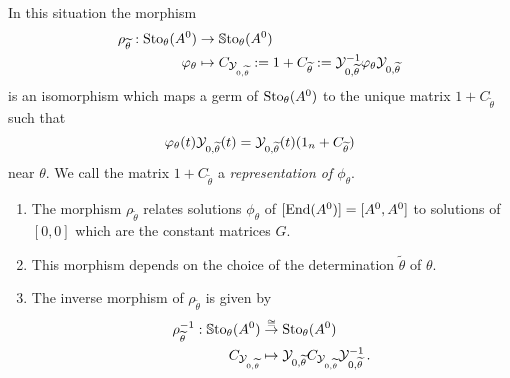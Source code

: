 \begin{prop}\label{prop:representation}
  In this situation the morphism
  \begin{align*}
    \rho_{\widetilde\theta}:\operatorname{Sto}_\theta(A^0)&\to\operatorname{\mathbb{S}to}_\theta(A^0)
    \\\varphi_\theta
    &\mapsto
    C_{\mathcal{Y}_{0,\widetilde\theta}}
    :=1+C_{\widetilde\theta}
    :=\mathcal{Y}_{0,\widetilde\theta}^{-1}\varphi_\theta\mathcal{Y}_{0,\widetilde\theta}
  \end{align*}
  is an isomorphism which maps a germ of $\operatorname{Sto}_\theta(A^0)$ to the unique
  matrix $1+C_{\tilde\theta}$ such that
  \begin{equation} \label{eq:representation}
    \varphi_\theta(t)\mathcal{Y}_{0,\widetilde\theta}(t)
    =\mathcal{Y}_{0,\widetilde\theta}(t)(1_n+C_{\widetilde\theta})
  \end{equation}
  near $\theta$.  We call the matrix $1+C_{\tilde\theta}$ a
  \emph{representation of $\phi_\theta$}.
  \begin{s-rem}
    \begin{enumerate}
      \item {}
        The morphism $\rho_{\tilde\theta}$ relates solutions $\phi_\theta$ of
        $[\operatorname{End}(A^0)]=[A^0,A^0]$ to solutions of $[0,0]$ which are the constant
        matrices $G$.
      \item This morphism depends on the choice of the determination
        $\tilde\theta$ of $\theta$.
      \item The inverse morphism of $\rho_{\tilde\theta}$ is given by
        \begin{align*}
          \rho_{\widetilde\theta}^{-1}:
          \operatorname{\mathbb{S}to}_\theta(A^0)
          &\overset{\cong}\to
          \operatorname{Sto}_\theta(A^0)
          \\C_{\mathcal{Y}_{0,\widetilde\theta}} &\mapsto
          \mathcal{Y}_{0,\widetilde\theta}C_{\mathcal{Y}_{0,\widetilde\theta}}\mathcal{Y}_{0,\widetilde\theta}^{-1}
          \,.
        \end{align*}
    \end{enumerate}
  \end{s-rem}
\end{prop}
